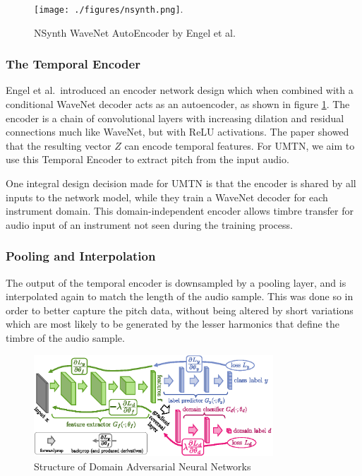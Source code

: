 \documentclass[12pt,a4paper,]{report}
\begin{document}
\begin{figure}[h]
    \texttt{[image: ./figures/nsynth.png]}.
    \centering
    \caption[NSynth WaveNet AutoEnocder]{NSynth WaveNet AutoEncoder by Engel et al.} \label{fig:nsynth}
\end{figure}

\hypertarget{the-temporal-encoder}{%
\subsubsection{The Temporal Encoder}\label{the-temporal-encoder}}

Engel et al.~introduced an encoder network design which when combined
with a conditional WaveNet decoder acts as an autoencoder, as shown in
figure \ref{fig:nsynth}. The encoder is a chain of convolutional layers
with increasing dilation and residual connections much like WaveNet, but
with ReLU activations. The paper showed that the resulting vector \(Z\)
can encode temporal features. For UMTN, we aim to use this Temporal
Encoder to extract pitch from the input audio.

One integral design decision made for UMTN is that the encoder is shared
by all inputs to the network model, while they train a WaveNet decoder
for each instrument domain. This domain-independent encoder allows
timbre transfer for audio input of an instrument not seen during the
training process.

\hypertarget{pooling-and-interpolation}{%
\subsubsection{Pooling and
Interpolation}\label{pooling-and-interpolation}}

The output of the temporal encoder is downsampled by a pooling layer,
and is interpolated again to match the length of the audio sample. This
was done so in order to better capture the pitch data, without being
altered by short variations which are most likely to be generated by the
lesser harmonics that define the timbre of the audio sample.

\begin{figure}[h]
    \includegraphics[width=0.8\textwidth]{figures/dann.eps}
    \centering
    \caption{Structure of Domain Adversarial Neural Networks \label{fig:dann}}
\end{figure}
\end{document}
